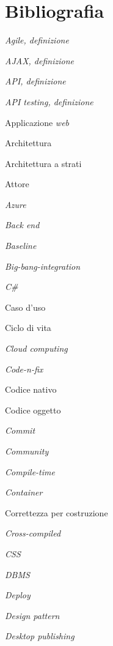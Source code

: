 

\cleardoublepage
\chapter{Bibliografia}

\begin{enumerate}[label={[\arabic*]}]
	\item \textit{Agile, definizione}
	\item \textit{AJAX, definizione}
	\item \textit{API, definizione}
	\item \textit{API testing, definizione}
	\item Applicazione \textit{web}
	\item Architettura 
	\item Architettura a strati
	\item Attore 
	\item \textit{Azure} 
	\item \textit{Back end} 
	\item \textit{Baseline} 
	\item \textit{Big-bang-integration} 
	\item \textit{C\#}
	\item Caso d’uso
	\item Ciclo di vita 
	\item \textit{Cloud computing}
	\item \textit{Code-n-ﬁx} 
	\item Codice nativo 
	\item Codice oggetto
	\item \textit{Commit} 
	\item \textit{Community} 
	\item \textit{Compile-time} 
	\item \textit{Container} 
	\item Correttezza per costruzione 
	\item \textit{Cross-compiled} 
	\item \textit{CSS} 
	\item \textit{DBMS}
	\item \textit{Deploy} 
	\item \textit{Design pattern} 
	\item \textit{Desktop publishing} 

\end{enumerate}
